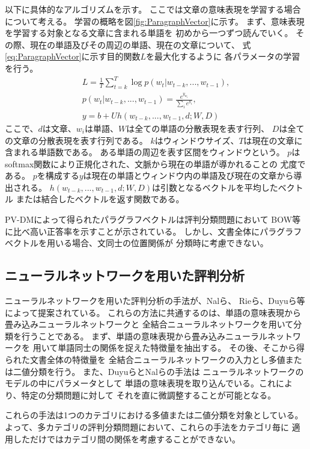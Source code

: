 \documentclass{ttithesis}
\begin{document}
以下に具体的なアルゴリズムを示す。
ここでは文章の意味表現を学習する場合について考える。
学習の概略を図\ref{fig:ParagraphVector}に示す。
まず、意味表現を学習する対象となる文章に含まれる単語を
初めから一つずつ読んでいく。
その際、現在の単語及びその周辺の単語、現在の文章について、
式\ref{eq:ParagraphVector}に示す目的関数$L$を最大化するように
各パラメータの学習を行う。
\begin{gather}
  L = \frac{1}{T} \sum^{T}_{t = k} \log p(w_t | w_{t-k}, ..., w_{t-1}),
    \label{eq:ParagraphVector} \\
  p(w_t | w_{t-k}, ..., w_{t-1}) = \frac{e^{y_{w_t}}}{\sum_i e^{y_i}},
    \nonumber \\
  y = b + Uh(w_{t-k}, ..., w_{t-1}, d; W, D) \nonumber
\end{gather}
ここで、$d$は文章、$w_i$は単語、$W$は全ての単語の分散表現を表す行列、
$D$は全ての文章の分散表現を表す行列である。
$k$はウィンドウサイズ、$T$は現在の文章に含まれる単語数である。
ある単語の周辺を表す区間をウィンドウという。
$p$はsoftmax関数により正規化された、文脈から現在の単語が導かれることの
尤度である。
$p$を構成する$y$は現在の単語とウィンドウ内の単語及び現在の文章から導出される。
$h(w_{t-k}, ..., w_{t-1}, d; W, D)$は引数となるベクトルを平均したベクトル
または結合したベクトルを返す関数である。

PV-DMによって得られたパラグラフベクトルは評判分類問題において
BOW等に比べ高い正答率を示すことが示されている。
しかし、文書全体にパラグラフベクトルを用いる場合、文同士の位置関係が
分類時に考慮できない。


\subsection{ニューラルネットワークを用いた評判分析}

ニューラルネットワークを用いた評判分析の手法が、Nalら\cite{nal14}、
Rieら\cite{rie14}、Duyuら\cite{duyu15}等によって提案されている。
これらの方法に共通するのは、単語の意味表現から畳み込みニューラルネットワークと
全結合ニューラルネットワークを用いて分類を行うことである。
まず、単語の意味表現から畳み込みニューラルネットワークを
用いて単語同士の関係を捉えた特徴量を抽出する。
その後、そこから得られた文書全体の特徴量を
全結合ニューラルネットワークの入力とし多値または二値分類を行う。
また、Duyuら\cite{duyu15}とNalら\cite{nal14}の手法は
ニューラルネットワークのモデルの中にパラメータとして
単語の意味表現を取り込んでいる。これにより、特定の分類問題に対して
それを直に微調整することが可能となる。

これらの手法は1つのカテゴリにおける多値または二値分類を対象としている。
よって、多カテゴリの評判分類問題において、これらの手法をカテゴリ毎に
適用しただけではカテゴリ間の関係を考慮することができない。
\end{document}
